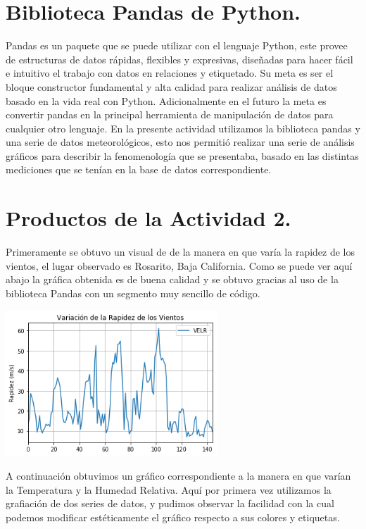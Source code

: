 \documentclass{article} %
\begin{document}
\section{Biblioteca Pandas de Python.}
Pandas es un paquete que se puede utilizar con el lenguaje Python, este provee de estructuras de datos rápidas, flexibles y expresivas, diseñadas para hacer fácil e intuitivo el trabajo con datos en relaciones y etiquetado. Su meta es ser el bloque constructor fundamental y alta calidad para realizar análisis de datos basado en la vida real con Python. Adicionalmente en el futuro la meta es convertir pandas en la principal herramienta de manipulación de datos para cualquier otro lenguaje.
\vspace{0.5 cm}
En la presente actividad utilizamos la biblioteca pandas y una serie de datos meteorológicos, esto nos permitió realizar una serie de análisis gráficos para describir la fenomenología que se presentaba, basado en las distintas mediciones que se tenían en la base de datos correspondiente. 


\section{Productos de la Actividad 2.}
Primeramente se obtuvo un visual de de la manera en que varía la rapidez de los vientos, el lugar observado es Rosarito, Baja California. Como se puede ver aquí abajo la gráfica obtenida es de buena calidad y se obtuvo gracias al uso de la biblioteca Pandas con un segmento muy sencillo de código.
 \begin{center}
 	\includegraphics[width=8cm]{1.png}
 \end{center}

A continuación obtuvimos un gráfico correspondiente a la manera en que varían la Temperatura y la Humedad Relativa. Aquí por primera vez utilizamos la grafiación de dos series de datos, y pudimos observar la facilidad con la cual podemos modificar estéticamente el gráfico respecto a sus colores y etiquetas.
\end{document}
